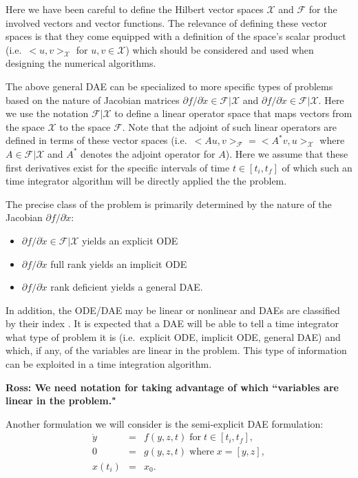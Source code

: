 \documentclass[pdf,ps2pdf,11pt]{SANDreport}
\begin{document}
Here we have been careful to define the Hilbert vector spaces $\mathcal{X}$
and $\mathcal{F}$ for the involved vectors and vector functions.  The
relevance of defining these vector spaces is that they come equipped with a
definition of the space's scalar product (i.e.\ $<u,v>_{\mathcal{X}}$ for
$u,v\in\mathcal{X}$) which should be considered and used when designing the
numerical algorithms.

The above general DAE can be specialized to more specific types of problems
based on the nature of Jacobian matrices ${}\partial f / {}\partial
{}\dot{x}\in\mathcal{F}|\mathcal{X}$ and ${}\partial f / {}\partial
{}\dot{x}\in\mathcal{F}|\mathcal{X}$.  Here we use the notation
$\mathcal{F}|\mathcal{X}$ to define a linear operator space that maps vectors
from the space $\mathcal{X}$ to the space $\mathcal{F}$.  Note that the
adjoint of such linear operators are defined in terms of these vector spaces
(i.e.\ $<A u,v>_{\mathcal{F}} = <A^* v,u>_{\mathcal{X}}$ where
$A\in\mathcal{F}|\mathcal{X}$ and $A^*$ denotes the adjoint operator for $A$).
Here we assume that these first derivatives exist for the specific intervals
of time $t\in[t_i,t_f]$ of which such an time integrator algorithm will be
directly applied the the problem.

The precise class of the problem is primarily determined by the nature of the
Jacobian ${}\partial f / {}\partial {}\dot{x}$:
%
\begin{itemize}
%
{}\item ${}\partial f / {}\partial {}\dot{x} {}\in {}\mathcal{F}|\mathcal{X}$ yields an explicit ODE
%
{}\item ${}\partial f / {}\partial {}\dot{x}$ full rank yields an implicit ODE
%
{}\item ${}\partial f / {}\partial {}\dot{x}$ rank deficient yields a general
DAE.
\end{itemize}
%
In addition, the ODE/DAE may be linear or nonlinear and DAEs are classified by
their index \cite{BCP}.  It is expected that a DAE will be able to tell a time
integrator what type of problem it is (i.e.\ explicit ODE, implicit ODE,
general DAE) and which, if any, of the variables are linear in the problem.
This type of information can be exploited in a time integration algorithm.

{}\textbf{Ross: We need notation for taking advantage of which ``variables are linear in the problem."}

Another formulation we will consider is the semi-explicit DAE formulation:
\begin{equation}
\label{rythmos:eqn:dae:semiexplicit} 
\begin{array}{rcl}
\dot{y} & = & f(y,z,t) \; \mbox{for} \; t \in [t_i, t_f], \\
0       & = & g(y,z,t) \; \mbox{where} \; x = [y, z], \\
x(t_i)  & = & x_0.
\end{array}
\end{equation}
\end{document}
